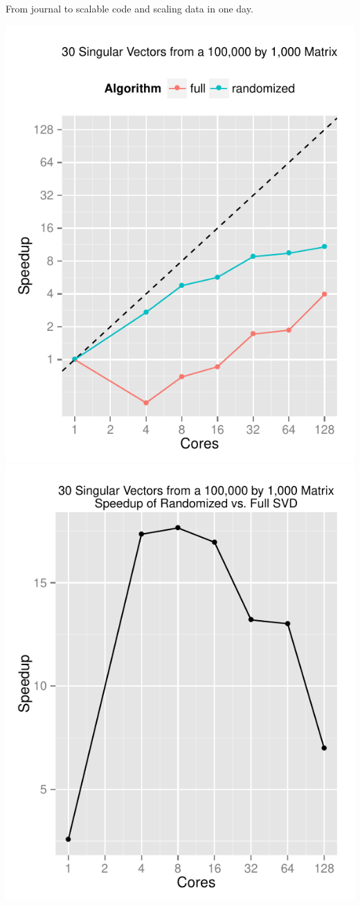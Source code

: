 \begin{frame}
  \begin{block}{From journal to scalable code and scaling data in one day.}
    \begin{center}
      \includegraphics[width=.4\textwidth]{../common/pics/randsvd/randSVDspeedup}
      \hspace{1cm}
      \includegraphics[width=.4\textwidth]{../common/pics/randsvd/randSpeedupSVD}
    \end{center}
  \end{block}
\end{frame}